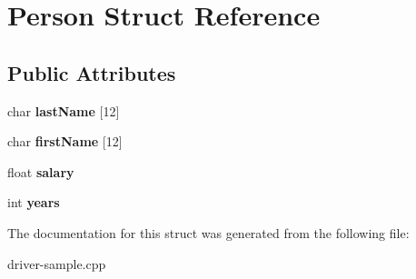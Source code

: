 \hypertarget{structPerson}{\section{Person Struct Reference}
\label{structPerson}
}
\subsection*{Public Attributes}
\begin{DoxyCompactItemize}
\item 
\hypertarget{structPerson_afaeb8ee452b0984d66d6ad240cb905d3}{char {\bfseries last\-Name} \mbox{[}12\mbox{]}}\label{structPerson_afaeb8ee452b0984d66d6ad240cb905d3}

\item 
\hypertarget{structPerson_a33209750ceffb2469bcfc3c88e091e4a}{char {\bfseries first\-Name} \mbox{[}12\mbox{]}}\label{structPerson_a33209750ceffb2469bcfc3c88e091e4a}

\item 
\hypertarget{structPerson_ab993b9296f5e833ecd1cfba33666759a}{float {\bfseries salary}}\label{structPerson_ab993b9296f5e833ecd1cfba33666759a}

\item 
\hypertarget{structPerson_a0b46b77af06b68baf41911dfc3f097fc}{int {\bfseries years}}\label{structPerson_a0b46b77af06b68baf41911dfc3f097fc}

\end{DoxyCompactItemize}


The documentation for this struct was generated from the following file\-:\begin{DoxyCompactItemize}
\item 
driver-\/sample.\-cpp\end{DoxyCompactItemize}
